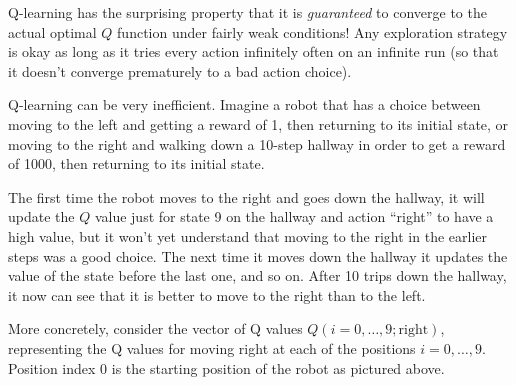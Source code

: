 Q-learning has the surprising property that it is {\em guaranteed} to
converge to the actual optimal $Q$ function under fairly weak
conditions!  Any exploration strategy is okay as long as it tries
every action infinitely often on an infinite run (so that it doesn't
converge prematurely to a bad action choice).

Q-learning can be very inefficient. Imagine a robot that has a
choice between moving to the left and getting a reward of 1, then
returning to its initial state, or moving to the right and walking
down a 10-step hallway in order to get a reward of 1000, then
returning to its initial state.

\begin{center}
\end{center}

The first time the robot moves to the right and goes down the hallway,
it will update the $Q$ value just for state 9 on the hallway and
action ``right'' to have a high value, but it won't yet understand
that moving to the right in the earlier steps was a good choice. The
next time it moves down the hallway it updates the value of the state
before the last one, and so on.  After 10 trips down the hallway, it
now can see that it is better to move to the right than to the left.

\setcounter{MaxMatrixCols}{20}

More concretely, consider the vector of Q values $Q(i = 0, \ldots, 9;
  \text{right})$, representing the Q values for moving right at each of
the positions $i = 0, \ldots, 9$. Position index $0$ is the starting
position of the robot as pictured above.

